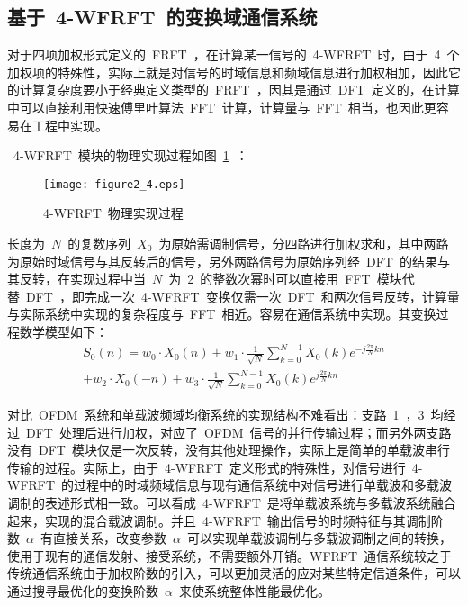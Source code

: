 \subsection{基于~4-WFRFT~的变换域通信系统}

对于四项加权形式定义的~FRFT~，在计算某一信号的~4-WFRFT~时，由于~4~个加权项的特殊性，实际上就是对信号的时域信息和频域信息进行加权相加，因此它的计算复杂度要小于经典定义类型的~FRFT~，因其是通过~DFT~定义的，在计算中可以直接利用快速傅里叶算法~FFT~计算，计算量与~FFT~相当，也因此更容易在工程中实现。

~4-WFRFT~模块的物理实现过程如图~\ref{jiaquanshixianguocheng}~：
\begin{figure}[htbp]
\centering
\texttt{[image: figure2\_4.eps]}
\caption{4-WFRFT~物理实现过程}\vspace{-1em}\label{jiaquanshixianguocheng}
\end{figure}
长度为~$N$~的复数序列~$X_0$~为原始需调制信号，分四路进行加权求和，其中两路为原始时域信号与其反转后的信号，另外两路信号为原始序列经~DFT~的结果与其反转，在实现过程中当~$N$~为~2~的整数次幂时可以直接用~FFT~模块代替~DFT~，即完成一次~4-WFRFT~变换仅需一次~DFT~和两次信号反转，计算量与实际系统中实现的复杂程度与~FFT~相近。容易在通信系统中实现。其变换过程数学模型如下：
\begin{equation}\label{WFRFTgongshi}
\begin{split}
{S_0}(n) = {w_0} \cdot {X_0}(n) + {w_1} \cdot \frac{1}{{\sqrt N }}\sum\limits_{k = 0}^{N - 1} {{X_0}(k){e^{ - j\frac{{2\pi }}{N}kn}}}\\
 +  {w_2} \cdot {X_0}( - n) + {w_3} \cdot \frac{1}{{\sqrt N }}\sum\limits_{k = 0}^{N - 1} {{X_0}(k){e^{j\frac{{2\pi }}{N}kn}}}
\end{split}
\end{equation}

对比~OFDM~系统和单载波频域均衡系统的实现结构不难看出：支路~1~，3~均经过~DFT~处理后进行加权，对应了~OFDM~信号的并行传输过程；而另外两支路没有~DFT~模块仅是一次反转，没有其他处理操作，实际上是简单的单载波串行传输的过程。实际上，由于~4-WFRFT~定义形式的特殊性，对信号进行~4-WFRFT~的过程中的时域频域信息与现有通信系统中对信号进行单载波和多载波调制的表述形式相一致。可以看成~4-WFRFT~是将单载波系统与多载波系统融合起来，实现的混合载波调制。并且~4-WFRFT~输出信号的时频特征与其调制阶数~$\alpha$~有直接关系，改变参数~$\alpha$~可以实现单载波调制与多载波调制之间的转换，使用于现有的通信发射、接受系统，不需要额外开销。WFRFT~通信系统较之于传统通信系统由于加权阶数的引入，可以更加灵活的应对某些特定信道条件，可以通过搜寻最优化的变换阶数~$\alpha$~来使系统整体性能最优化。

